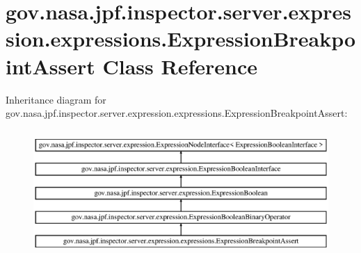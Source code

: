 \hypertarget{classgov_1_1nasa_1_1jpf_1_1inspector_1_1server_1_1expression_1_1expressions_1_1_expression_breakpoint_assert}{}\section{gov.\+nasa.\+jpf.\+inspector.\+server.\+expression.\+expressions.\+Expression\+Breakpoint\+Assert Class Reference}
\label{classgov_1_1nasa_1_1jpf_1_1inspector_1_1server_1_1expression_1_1expressions_1_1_expression_breakpoint_assert}
Inheritance diagram for gov.\+nasa.\+jpf.\+inspector.\+server.\+expression.\+expressions.\+Expression\+Breakpoint\+Assert\+:\begin{figure}[H]
\begin{center}
\leavevmode
\includegraphics[height=4.827586cm]{classgov_1_1nasa_1_1jpf_1_1inspector_1_1server_1_1expression_1_1expressions_1_1_expression_breakpoint_assert}
\end{center}
\end{figure}
